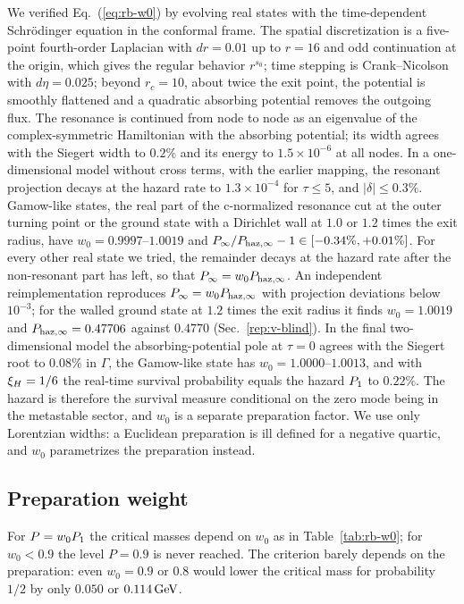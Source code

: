 We verified Eq.~(\ref{eq:rb-w0}) by evolving real states with the time-dependent Schr\"odinger equation in the conformal frame.
The spatial discretization is a five-point fourth-order Laplacian with $dr=0.01$ up to $r=16$ and odd continuation at the origin, which gives the regular behavior $r^{s_0}$; time stepping is Crank--Nicolson with $d\eta=0.025$; beyond $r_c=10$, about twice the exit point, the potential is smoothly flattened and a quadratic absorbing potential removes the outgoing flux. %
The resonance is continued from node to node as an eigenvalue of the complex-symmetric Hamiltonian with the absorbing potential; its width agrees with the Siegert width to $0.2\%$ and its energy to $1.5\times10^{-6}$ at all nodes. %
In a one-dimensional model without cross terms, with the earlier mapping, the resonant projection decays at the hazard rate to $1.3\times10^{-4}$ for $\tau\le5$, and $|\delta|\le0.3\%$. %
Gamow-like states, the real part of the c-normalized resonance cut at the outer turning point or the ground state with a Dirichlet wall at $1.0$ or $1.2$ times the exit radius, have $w_0=0.9997$--$1.0019$ and $P_\infty/P_{\rm haz,\infty}-1\in[-0.34\%,+0.01\%]$. %
For every other real state we tried, the remainder decays at the hazard rate after the non-resonant part has left, so that $P_\infty=w_0P_{\rm haz,\infty}$.
An independent reimplementation reproduces $P_\infty=w_0P_{\rm haz,\infty}$ with projection deviations below $10^{-3}$; for the walled ground state at $1.2$ times the exit radius it finds $w_0=1.0019$ and $P_{\rm haz,\infty}=0.47706$ against $0.4770$ (Sec.~\ref{rep:v-blind}). %
In the final two-dimensional model the absorbing-potential pole at $\tau=0$ agrees with the Siegert root to $0.08\%$ in $\Gamma$, the Gamow-like state has $w_0=1.0000$--$1.0013$, and with $\xi_H=1/6$ the real-time survival probability equals the hazard $P_1$ to $0.22\%$. %
The hazard is therefore the survival measure conditional on the zero mode being in the metastable sector, and $w_0$ is a separate preparation factor.
We use only Lorentzian widths: a Euclidean preparation is ill defined for a negative quartic, and $w_0$ parametrizes the preparation instead.

\subsection{Preparation weight}
\label{sec:rb-w0}

For $P=w_0P_1$ the critical masses depend on $w_0$ as in Table~\ref{tab:rb-w0}; for $w_0<0.9$ the level $P=0.9$ is never reached. %
The criterion barely depends on the preparation: even $w_0=0.9$ or $0.8$ would lower the critical mass for probability $1/2$ by only $0.050$ or $0.114\,\mathrm{GeV}$. %

